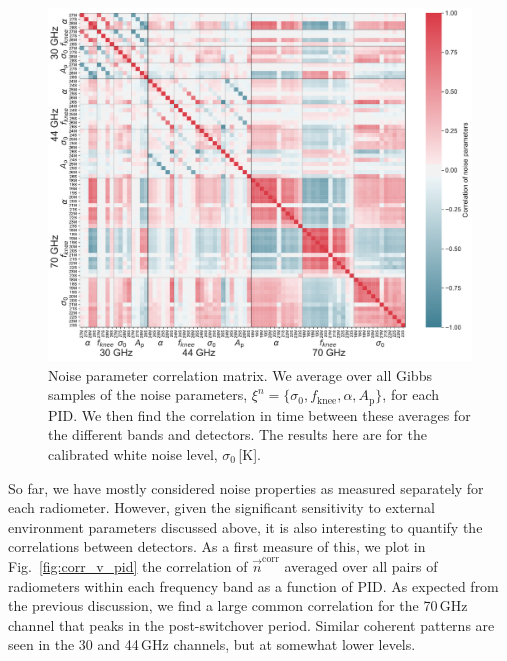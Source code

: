 \documentclass{aa}
\newcommand{\n}[0]{\vec{n}}
\begin{document}
\begin{figure}
        \begin{center}
                \includegraphics[width=1.0\linewidth]{figs/noise_parameter_correlation_new.pdf}
        \end{center}
        \caption{Noise parameter correlation matrix. We average over all Gibbs samples of the noise parameters, $\xi^n = \{\sigma_0, f_\mathrm{knee}, \alpha, A_\mathrm{p}\}$, for each PID. We then find the correlation in time between these averages for the different bands and detectors. The results here are for the calibrated white noise level, $\sigma_0$\,[K].
                \label{fig:xi_corr}}
\end{figure}

So far, we have mostly considered noise properties as measured
separately for each radiometer. However, given the significant
sensitivity to external environment parameters discussed above, it is
also interesting to quantify the correlations between detectors. As a
first measure of this, we plot in Fig.~\ref{fig:corr_v_pid} the
correlation of $\n^{\mathrm{corr}}$ averaged over all pairs of
radiometers within each frequency band as a function of PID. As
expected from the previous discussion, we find a large common
correlation for the 70\,GHz channel that peaks in the post-switchover
period. Similar coherent patterns are seen in the 30 and 44\,GHz
channels, but at somewhat lower levels.
\end{document}
